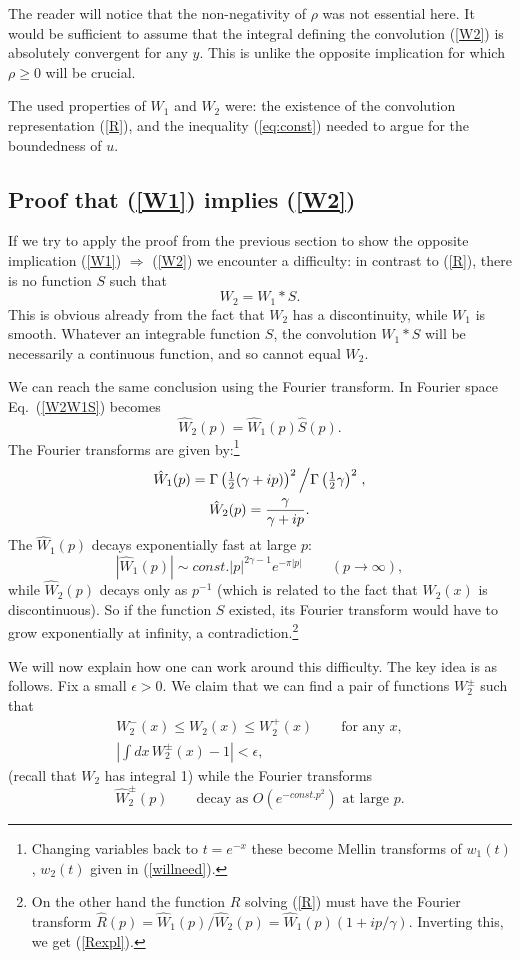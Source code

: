 \documentclass[12pt]{article}
\newcommand{\reef}[1]{(\ref{#1})}
\def\eps{\epsilon}
\newcommand{\beq}{\begin{equation}}
\newcommand{\eeq}{\end{equation}}
\def\half{{\textstyle\frac 12}}
\def\ge{\geqslant}
\def\le{\leqslant}
\def\eps{\epsilon}
\numberwithin{equation}{section}
\begin{document}
The reader will notice that the non-negativity of $\rho$ was not essential here. It would be sufficient to assume that the integral defining the convolution \reef{W2} is absolutely convergent for any $y$. This is unlike the opposite implication for which $\rho\ge0$ will be crucial. 

The used properties of $W_1$ and $W_2$ were: the existence of the convolution representation \reef{R},
{and the inequality \reef{eq:const} needed to argue for the boundedness of $u$. }

\subsection{Proof that \reef{W1} implies \reef{W2}}

If we try to apply the proof from the previous section to show the opposite implication \reef{W1} $\Rightarrow$ \reef{W2} we encounter a difficulty: in contrast to \reef{R}, there is no function $S$ such that
\beq
\label{W2W1S}
W_2 = W_1 * S.
\eeq
This is obvious already from the fact that $W_2$ has a discontinuity, while $W_1$ is smooth. Whatever an integrable function $S$, the convolution $W_1*S$ will be necessarily a continuous function, and so cannot equal $W_2$.

We can reach the same conclusion using the Fourier transform. In Fourier space Eq.~\reef{W2W1S} becomes
\beq
\hat W_2(p) = \hat W_1(p) \hat S(p).
\eeq
The Fourier transforms are given by:\footnote{Changing variables back to $t=e^{-x}$ these become Mellin transforms of $w_1(t)$, $w_2(t)$ given in \reef{willneed}.}
\begin{gather}
\label{MW1}
\hat W_1(p)=\Gamma\left(\half(\gamma+ip)\right)^2\left/\Gamma\left(\half \gamma\right)^2\right.,\\
\hat W_2(p) = \frac{\gamma}{\gamma+ip}.
\end{gather}
The $\hat W_1(p)$ decays exponentially fast at large $p$:
\beq
|\hat W_1(p)|\sim const. |p|^{2\gamma-1} e^{-\pi|p|}\qquad(p\to\infty),
\eeq
while $\hat W_2(p)$ decays only as $p^{-1}$ (which is related to the fact that $W_2(x)$ is discontinuous). So if the function $S$ existed, its Fourier transform would have to grow exponentially at infinity, a contradiction.\footnote{\label{noteR}On the other hand the function $R$ solving \reef{R} must have the Fourier transform
$\hat R(p) = \hat W_1(p)/\hat W_2(p) = \hat W_1(p)(1+ip/\gamma).$
Inverting this, we get \reef{Rexpl}.}

We will now explain how one can work around this difficulty. 
The key idea is as follows. Fix a small $\eps>0$. We claim that we can find a pair of functions $W_2^{\pm}$ such that
\begin{gather} 
W_2^-(x)\le W_2(x) \le W_2^+(x)\qquad\text {for any }x,
\label{squeeze}\\
\left|\int dx\,W_2^\pm (x) - 1\right| <\eps,
\label{squeeze1}
\end{gather}
(recall that $W_2$ has integral 1) while the Fourier transforms 
\beq
\hat W_2^\pm(p) \qquad\text{decay as $O(e^{-const.p^2})$ at large $p$}.
\eeq
\end{document}

